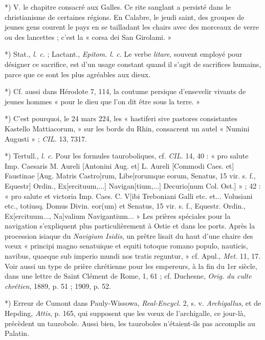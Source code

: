 \documentclass[a4paper, 11pt, oneside, polutonikogreek, french]{article}
\begin{document}
*) V. le chapitre consacré aux Galles. Ce rite sanglant a persisté dans le christianisme de certaines régions. En Calabre, le jeudi saint, des groupes de jeunes gens courent le pays en se tailladant les chairs avec des morceaux de verre ou des lancettes ; c'est la « corsa dei San Girolami. »

*) Stat., \emph{l. c.} ; Lactant., \emph{Epitom. l. c.} Le verbe \emph{litare}, souvent employé pour désigner ce sacrifice, est d'un usage constant quand il s'agit de sacrifices humains, parce que ce sont les plus agréables aux dieux.

*) Cf. aussi dans Hérodote 7, 114, la coutume persique d'ensevelir vivants de jeunes hommes « pour le dieu que l'on dit être sous la terre. »

*) C'est pourquoi, le 24 mars 224, les « hastiferi sive pastores consistantes Kastello Mattiacorum, » sur les bords du Rhin, consacrent un autel « Numini Augusti » ; \emph{CIL.} 13, 7317.

*) Tertull., \emph{l. c.} Pour les formules tauroboliques, cf. \emph{CIL.} 14, 40 : « pro salute Imp. Caesaris M. Aureli [Antonini Aug. et] L. Aureli [Commodi Caes. et] Faustinae [Aug. Matris Castro]rum, Libe[rorumque eorum, Senatus, 15 vir. s. f., Equestr] Ordin., Ex[ercituum,...] Navigan[tium,...] Decurio[num Col. Ost.] » ; 42 : « pro salute et victoria Imp. Caes. C. V[ibi Treboniani Galli etc. et... Volusiani etc., totiusq. Domus Divin. eor(um) et Senatus, 15 vir. s. f., Equestr. Ordin., Ex[ercituum..., Na]valium Navigantium... » Les prières spéciales pour la navigation s'expliquent plus particulièrement à Ostie et dans les ports. Après la procession isiaque du \emph{Navigium Isidis}, un prêtre lisait du haut d'une chaire des vœux « principi magno senatuique et equiti totoque romano populo, nauticis, navibus, quaeque sub imperio mundi nos tratis reguntur, » cf. Apul., \emph{Met.} 11, 17. Voir aussi un type de prière chrétienne pour les empereurs, à la fin du 1er siècle, dans une lettre de Saint Clément de Rome, 1, 61 ; cf. Duchesne, \emph{Orig. du culte chrétien}, 1889, p. 51 ; 1909, p. 52.

*) Erreur de Cumont dans Pauly-Wissowa, \emph{Real-Encycl.} 2, s. v. \emph{Archigallus}, et de Hepding, \emph{Attis}, p. 165, qui supposent que les vœux de l'archigalle, ce jour-là, précèdent un taurobole. Aussi bien, les tauroboles n'étaient-ils pas accomplis au Palatin.
\end{document}
